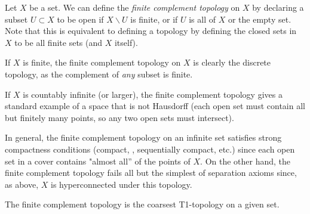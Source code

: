 \documentclass[12pt]{article}
\newcommand{\<}{\langle}
\renewcommand{\>}{\rangle}
\begin{document}
Let $X$ be a set.  We can define the \emph{finite complement topology} on $X$ by declaring a subset $U\subset X$ to be open if $X\backslash U$ is finite, or if $U$ is all of $X$ or the empty set.  Note that this is equivalent to defining a topology by defining the closed sets in $X$ to be all finite sets (and $X$ itself).

If $X$ is finite, the finite complement topology on $X$ is clearly the discrete topology, as the complement of \emph{any} subset is finite.

If $X$ is countably infinite (or larger), the finite complement topology gives a standard example of a space that is not Hausdorff (each open set must contain all but finitely many points, so any two open sets must intersect).

In general, the finite complement topology on an infinite set satisfies strong compactness conditions (compact, , sequentially compact, etc.) since each open set in a cover contains "almost all'' of the points of $X$.  On the other hand, the finite complement topology fails all but the simplest of separation axioms since, as above, $X$ is hyperconnected under this topology.

The finite complement topology is the coarsest T1-topology on a given set.
\end{document}
